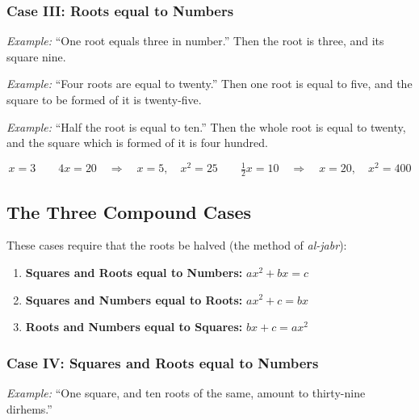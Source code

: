 \documentclass[11pt,a4paper,openany,oneside]{book}
\begin{document}
\subsubsection*{Case III: Roots equal to Numbers}

\textit{Example:} ``One root equals three in number.'' Then the root is three,
and its square nine.

\textit{Example:} ``Four roots are equal to twenty.'' Then one root is equal to
five, and the square to be formed of it is twenty-five.

\textit{Example:} ``Half the root is equal to ten.'' Then the whole root is equal
to twenty, and the square which is formed of it is four hundred.

\begin{equation}
\boxed{x = 3}
\qquad
\boxed{4x = 20 \quad\Rightarrow\quad x = 5, \quad x^2 = 25}
\qquad
\boxed{\tfrac{1}{2}x = 10 \quad\Rightarrow\quad x = 20, \quad x^2 = 400}
\end{equation}

\subsection{The Three Compound Cases}

These cases require that the roots be halved (the method of \textit{al-jabr}):

\begin{mathbox}[title={\textbf{Compound Cases (require halving the roots)}}]
\begin{enumerate}[label=\textbf{Case \Roman*:},leftmargin=3em]
  \item[(IV)] \textbf{Squares and Roots equal to Numbers:}
  $ax^2 + bx = c$
  
  \item[(V)] \textbf{Squares and Numbers equal to Roots:}
  $ax^2 + c = bx$
  
  \item[(VI)] \textbf{Roots and Numbers equal to Squares:}
  $bx + c = ax^2$
\end{enumerate}
\end{mathbox}

\subsubsection*{Case IV: Squares and Roots equal to Numbers}

\textit{Example:} ``One square, and ten roots of the same, amount to
thirty-nine dirhems.''
\end{document}
